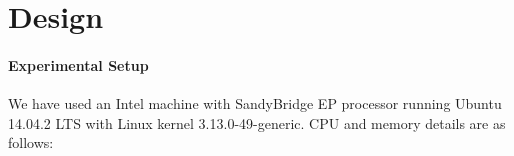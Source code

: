 \section{Design}
\label{Design}

%
%
%
%
%
%
%
%
%
%
%
%
%
%
%
%
%
%
%
%
%

\paragraph{Experimental Setup}
We have used an Intel machine with SandyBridge EP processor running
Ubuntu 14.04.2 LTS with Linux kernel 3.13.0-49-generic.  CPU and
memory details are as follows:

